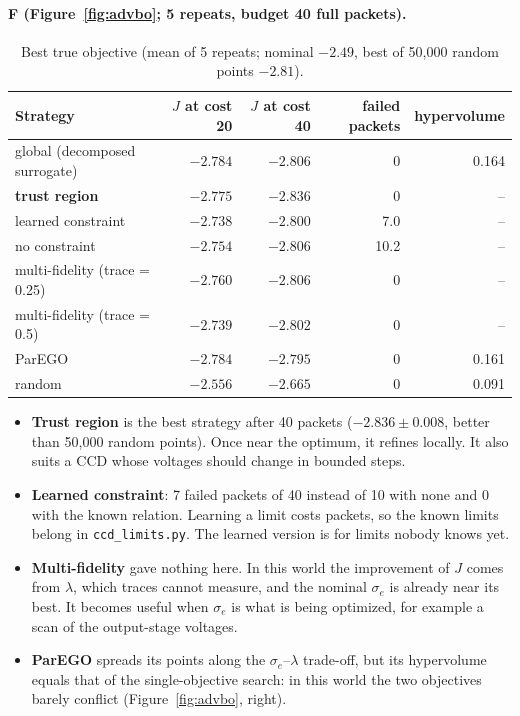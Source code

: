 \documentclass[10pt]{article}
\newcommand{\code}[1]{\texttt{#1}}
\begin{document}
\paragraph{F (Figure~\ref{fig:advbo}; 5 repeats, budget 40 full packets).}
\begin{table}[h]
\centering\small
\begin{tabular}{lrrrr}
\toprule
Strategy & $J$ at cost 20 & $J$ at cost 40 & failed packets & hypervolume \\
\midrule
global (decomposed surrogate) & $-2.784$ & $-2.806$ & 0 & 0.164 \\
\textbf{trust region} & $-2.775$ & $\mathbf{-2.836}$ & 0 & -- \\
learned constraint & $-2.738$ & $-2.800$ & 7.0 & -- \\
no constraint & $-2.754$ & $-2.806$ & 10.2 & -- \\
multi-fidelity (trace = 0.25) & $-2.760$ & $-2.806$ & 0 & -- \\
multi-fidelity (trace = 0.5) & $-2.739$ & $-2.802$ & 0 & -- \\
ParEGO & $-2.784$ & $-2.795$ & 0 & 0.161 \\
random & $-2.556$ & $-2.665$ & 0 & 0.091 \\
\bottomrule
\end{tabular}
\caption{Best true objective (mean of 5 repeats; nominal $-2.49$, best of 50{,}000 random points $-2.81$).}
\label{tab:advbo}
\end{table}
\begin{itemize}
\item \textbf{Trust region} is the best strategy after 40 packets ($-2.836 \pm 0.008$, better than 50{,}000 random points). Once near the
  optimum, it refines locally. It also suits a CCD whose voltages should change in bounded steps.
\item \textbf{Learned constraint}: 7 failed packets of 40 instead of 10 with none and 0 with the known relation. Learning a limit costs
  packets, so the known limits belong in \code{ccd\_limits.py}. The learned version is for limits nobody knows yet.
\item \textbf{Multi-fidelity} gave nothing here. In this world the improvement of $J$ comes from $\lambda$, which traces cannot measure, and
  the nominal $\sigma_e$ is already near its best. It becomes useful when $\sigma_e$ is what is being optimized, for example a scan of the
  output-stage voltages.
\item \textbf{ParEGO} spreads its points along the $\sigma_e$--$\lambda$ trade-off, but its hypervolume equals that of the single-objective
  search: in this world the two objectives barely conflict (Figure~\ref{fig:advbo}, right).
\end{itemize}
\end{document}
